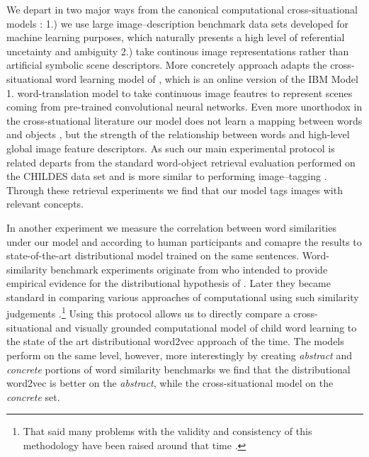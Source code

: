We depart in two major ways from the canonical computational cross-situational models 
 \citep{siskind.96,fontanari2009cross,fazly.etal.10,kachergis2012associative,matusevych2013automatic,yu2013grounded}: 
1.) we use large image--description benchmark data sets developed for machine learning purposes, 
which naturally presents a high level of referential uncetainty and ambiguity
2.) take continous image representations rather than artificial symbolic scene descriptors.
More concretely approach adapts the cross-situational word learning model of \citep{fazly.etal.10},
which is an online version of the IBM Model 1. word-translation model \citep{BrownPPM94} to take
continuous image feautres to represent scenes coming from pre-trained convolutional neural networks.
Even more unorthodox in the cross-stuational literature our model does not learn a mapping between 
words and objects 
\citep{fazly.etal.10,lazaridou2016multimodal}, but the strength of the relationship between words and high-level
global image feature descriptors. As such our main experimental protocol is related departs from
the standard word-object retrieval evaluation performed on the CHILDES data set \citep{goodman2008bayesian,kievit2013naturalistic,lazaridou2016multimodal} and is more similar
to performing image--tagging \citep{weston2010large}. Through these retrieval experiments we find that
our model tags images with relevant concepts.

In another experiment we measure the
correlation between word similarities under our model and according to human participants and comapre
the results to state-of-the-art distributional model trained on the same sentences.
Word-similarity benchmark experiments originate from \citep{rubenstein1965contextual} who 
intended to provide empirical evidence for the distributional hypothesis of  \citep{harris1954distributional}.
Later they became standard in comparing various approaches of computational using such 
similarity judgements \citep{faruqui2014community}.\footnote{That said many problems with the validity and
consistency of this methodology have been raised around that time \citep{faruqui2016problems}.}
Using this protocol allows us to directly compare a cross-situational and visually grounded computational
model of child word learning to the state of the art distributional word2vec approach of the time. 
The models perform on the same level, however, more interestingly by creating
\emph{abstract} and  \emph{concrete} portions of word similarity benchmarks we find that
the distributional word2vec is better on the \emph{abstract}, while the cross-situational model on the 
\emph{concrete} set.   

